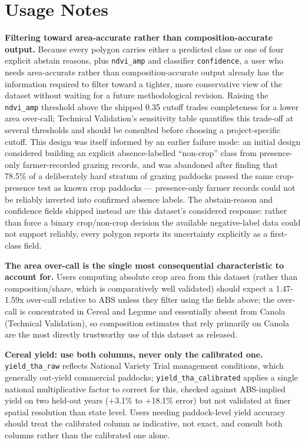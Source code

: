 
\section*{Usage Notes}\label{usage-notes}

\textbf{Filtering toward area-accurate rather than composition-accurate output.} Because every polygon carries either a predicted class or one of four explicit abstain reasons, plus \texttt{ndvi\_amp} and classifier \texttt{confidence}, a user who needs area-accurate rather than composition-accurate output already has the information required to filter toward a tighter, more conservative view of the dataset without waiting for a future methodological revision. Raising the \texttt{ndvi\_amp} threshold above the shipped 0.35 cutoff trades completeness for a lower area over-call; Technical Validation's sensitivity table quantifies this trade-off at several thresholds and should be consulted before choosing a project-specific cutoff. This design was itself informed by an earlier failure mode: an initial design considered building an explicit absence-labelled ``non-crop'' class from presence-only farmer-recorded grazing records, and was abandoned after finding that 78.5\% of a deliberately hard stratum of grazing paddocks passed the same crop-presence test as known crop paddocks --- presence-only farmer records could not be reliably inverted into confirmed absence labels. The abstain-reason and confidence fields shipped instead are this dataset's considered response: rather than force a binary crop/non-crop decision the available negative-label data could not support reliably, every polygon reports its uncertainty explicitly as a first-class field.

\textbf{The area over-call is the single most consequential characteristic to account for.} Users computing absolute crop area from this dataset (rather than composition/share, which is comparatively well validated) should expect a 1.47-1.59x over-call relative to ABS unless they filter using the fields above; the over-call is concentrated in Cereal and Legume and essentially absent from Canola (Technical Validation), so composition estimates that rely primarily on Canola are the most directly trustworthy use of this dataset as released.

\textbf{Cereal yield: use both columns, never only the calibrated one.} \texttt{yield\_tha\_raw} reflects National Variety Trial management conditions, which generally out-yield commercial paddocks; \texttt{yield\_tha\_calibrated} applies a single national multiplicative factor to correct for this, checked against ABS-implied yield on two held-out years (+3.1\% to +18.1\% error) but not validated at finer spatial resolution than state level. Users needing paddock-level yield accuracy should treat the calibrated column as indicative, not exact, and consult both columns rather than the calibrated one alone.

